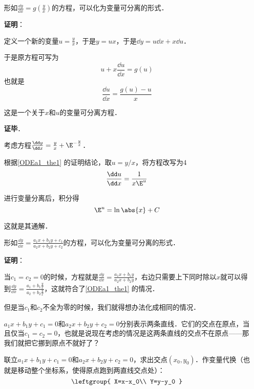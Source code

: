 \begin{theorem}{}\label{ODEa1_the1}
形如$\frac{\dd y}{\dd x}=g(\frac{y}{x})$的方程，可以化为变量可分离的形式．
\end{theorem}

\textbf{证明}：

定义一个新的变量$u=\frac{y}{x}$，于是$y=ux$，于是$\dd y=u\dd x+x\dd u$．

于是原方程可写为
\begin{equation}
u+x\frac{\dd u}{\dd x}=g(u)
\end{equation}
也就是
\begin{equation}
\frac{\dd u}{\dd x}=\frac{g(u)-u}{x}
\end{equation}

这是一个关于$x$和$u$的变量可分离方程．

\textbf{证毕}．

\begin{example}{}
考虑方程$\frac{\dd y}{\dd x}=\frac{y}{x}+\E^{-\frac{y}{x}}$．

根据\autoref{ODEa1_the1} 的证明结论，取$u=y/x$，将方程改写为4
\begin{equation}
\frac{\dd u}{\dd x}=\frac{1}{x\E^u}
\end{equation}

进行变量分离后，积分得
\begin{equation}
\E^u=\ln\abs{x}+C
\end{equation}

这就是其通解．


\end{example}


\begin{corollary}{}\label{ODEa1_cor1}
形如$\frac{\dd y}{\dd x}=\frac{a_1x+b_1y+c_1}{a_2x+b_2y+c_2}$的方程，可以化为变量可分离的形式．
\end{corollary}

\textbf{证明}：

当$c_1=c_2=0$的时候，方程就是$\frac{\dd y}{\dd x}=\frac{a_1x+b_1y}{a_2x+b_2y}$，右边只需要上下同时除以$x$就可以得到$\frac{\dd y}{\dd x}=\frac{a_1+b_1\frac{y}{x}}{a_2+b_2\frac{y}{x}}$，这就符合了\autoref{ODEa1_the1} 的情况．

但是当$c_1$和$c_2$不全为零的时候，我们就得想办法化成相同的情况．

$a_1x+b_1y+c_1=0$和$a_2x+b_2y+c_2=0$分别表示两条直线．它们的交点在原点，当且仅当$c_1=c_2=0$，也就是说现在考虑的情况是这两条直线的交点不在原点——那我们就把它挪到原点不就好了？

联立$a_1x+b_1y+c_1=0$和$a_2x+b_2y+c_2=0$，求出交点$(x_0, y_0)$．作变量代换（也就是移动整个坐标系，使得原点跑到两直线交点处）：
\begin{equation}
\leftgroup{
    X=x-x_0\\
    Y=y-y_0
}
\end{equation}

